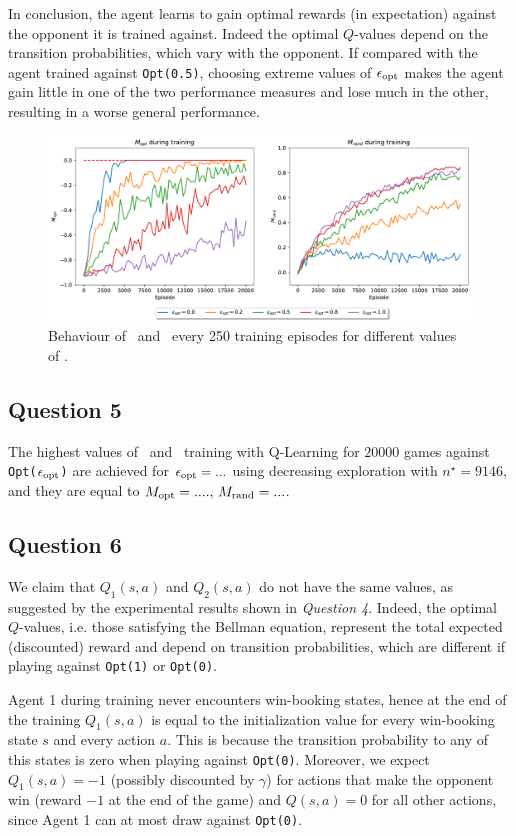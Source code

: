 \documentclass[10pt]{IEEEtran}
\begin{document}
In conclusion, the agent learns to gain optimal rewards (in expectation) against the opponent it is trained against. Indeed the optimal $Q$-values depend on the transition probabilities, which vary with the opponent. If compared with the agent trained against \texttt{Opt(0.5)}, choosing extreme values of $\epsilon_{\text{opt}}$ makes the agent gain little in one of the two performance measures and lose much in the other, resulting in a worse general performance.

\begin{figure}[h]
    \centering
    \includegraphics[width=\linewidth]{code/figures/performance_epsilon_opt.pdf}
    \caption{Behaviour of \mopt\  and \mrand\  every 250 training episodes for different values of \eopt.}
    \label{plot_question4}
\end{figure}

\subsection*{Question 5}
The highest values of \mopt\  and \mrand\  training with Q-Learning for $20000$ games against \texttt{Opt($\epsilon_{\text{opt}}$)} are achieved for \textcolor{red}{$\epsilon_{\text{opt}} = ...$} using decreasing exploration with $n^{\star} = 9146$, and they are equal to \textcolor{red}{$M_{\text{opt}} = ...., \, M_{\text{rand}} = ...$}.

\subsection*{Question 6}
We claim that $Q_1(s,a)$ and $Q_2(s,a)$ do not have the same values, as suggested by the experimental results shown in \emph{Question 4}.
Indeed, the optimal $Q$-values, i.e. those satisfying the Bellman equation, represent the total expected (discounted) reward and depend on transition probabilities, which are different if playing against \texttt{Opt(1)} or \texttt{Opt(0)}. 

Agent 1 during training never encounters win-booking states, hence at the end of the training $Q_1(s,a)$ is equal to the initialization value for every win-booking state $s$ and every action $a$. This is because the transition probability to any of this states is zero when playing against \texttt{Opt(0)}. Moreover, we expect $Q_1(s,a) = -1$ (possibly discounted by $\gamma$) for actions that make the opponent win (reward $-1$ at the end of the game) and $Q(s,a) = 0$ for all other actions, since Agent 1 can at most draw against \texttt{Opt(0)}. 
\end{document}
